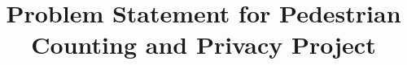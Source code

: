 \documentclass[journal,draftclsnofoot,onecolumn]{IEEEtran}
\begin{document}
    \title{Problem Statement for Pedestrian Counting and Privacy Project}
    
    \author
    {
        \\
    }
    

    
    
    
    {}
    
\end{document}
